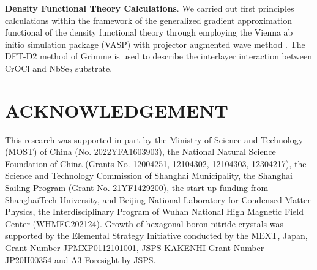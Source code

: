 \documentclass[%
 reprint,
superscriptaddress,
 amsmath,amssymb,
 aps,
]{revtex4-2}
\begin{document}
\textbf{Density Functional Theory Calculations}.
We carried out first principles calculations within the framework of the generalized gradient approximation functional \cite{PhysRevLett.77.3865} of the density functional theory through employing the Vienna ab initio simulation package (VASP) \cite{PhysRevB.47.558} with projector augmented wave method \cite{PhysRevB.50.17953}. The DFT-D2 method of Grimme \cite{Grimme} is used to describe the interlayer interaction between CrOCl and NbSe$_2$ substrate.



\bigskip
\section{ACKNOWLEDGEMENT}

This research was supported in part by the Ministry of Science and Technology (MOST) of China (No. 2022YFA1603903), the National Natural Science Foundation of China (Grants No. 12004251, 12104302, 12104303, 12304217), the Science and Technology Commission of Shanghai Municipality, the Shanghai Sailing Program (Grant No. 21YF1429200), the start-up funding from ShanghaiTech University, and Beijing National Laboratory for Condensed Matter Physics, the Interdisciplinary Program of Wuhan National High Magnetic Field Center (WHMFC202124). Growth of hexagonal boron nitride crystals was supported by the Elemental Strategy Initiative conducted by the MEXT, Japan, Grant Number JPMXP0112101001, JSPS KAKENHI Grant Number JP20H00354 and A3 Foresight by JSPS.








\end{document}
